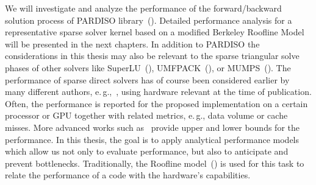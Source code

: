 We will investigate and analyze the performance of the forward/backward solution process of PARDISO library~(\cite{schenk-2004,schenk-2006,Bollhofer2020}). {\color{blue} Detailed performance analysis for a representative sparse solver kernel based on a modified Berkeley Roofline Model will be presented in the next chapters}.
In addition to PARDISO the considerations in this thesis may also be relevant to the sparse triangular solve phases of other  solvers like SuperLU~(\cite{li-2005}), UMFPACK~(\cite{davis-1997}), or MUMPS~(\cite{amestoy-2000,amestoy-2001,amestoy-2006}). The performance of sparse direct solvers has of course been considered earlier
by many different authors, e.\,g.,~\cite{heath-1999,sherry-2008,marrakchi-2017,park-2014,weifeng-2016},
using hardware relevant at the time of publication. Often, the performance is reported for the proposed implementation on a certain processor or GPU together with related metrics, e.\,g., data volume or cache misses. More advanced works such as~\cite{vuduc-2002} provide upper and lower bounds for the performance. {\color{blue} In this thesis, the goal is to apply analytical performance models which allow us not only to evaluate performance, but also to anticipate and prevent bottlenecks. Traditionally}, the Roofline
model~(\cite{callahan88,hockney89,schoenauer00,williams-2009}) is used
for this task to relate the performance of a code with the hardware's capabilities.

